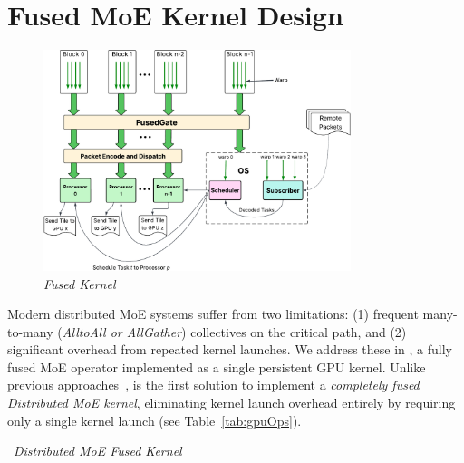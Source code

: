 \section{Fused MoE Kernel Design}\label{sec:method}
\begin{figure}[!ht]
    \centering
    \includegraphics[width=0.8\textwidth, keepaspectratio]{figures/architecture}
    \caption{\emph{\sysname Fused Kernel}}
    \label{fig:fusedK}
\end{figure}
Modern distributed MoE systems suffer from two limitations: (1) frequent many-to-many
(\emph{AlltoAll or AllGather}) collectives on the critical path, and
(2) significant overhead from repeated kernel launches.
We address these in \sysname, a fully fused MoE operator implemented
as a single persistent GPU kernel.
Unlike previous approaches~\cite{comet, deepep, pmlr-v162-rajbhandari22a, megatron, MLSYS2023_5616d34c,
    MLSYS2024_339caf45, 10.1145/3503221.3508418, 10.1145/3588964, 10.1145/3627703.3650083, 10.1145/3710848.3710868,
    NEURIPS2022_67d57c32},
\sysname is the first solution to implement a \emph{completely fused Distributed MoE kernel},
eliminating kernel launch overhead entirely by requiring only a single kernel launch (see Table~\ref{tab:gpuOps}).
\begin{algorithm}[!h]
    \small
    \DontPrintSemicolon
    \caption{~\emph{\sysname Distributed MoE Fused Kernel}}\label{alg:one}
\end{algorithm}

